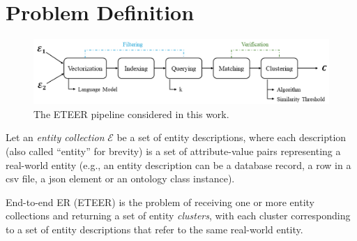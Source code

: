 \section{Problem Definition}\label{sec:problem}

\begin{figure}[t]
    \centering
\includegraphics[width=0.97\linewidth]{figures/pyjedai/pipeline-AutoER.png}
    \caption{The ETEER pipeline considered in this work.}
    \label{fig:eeter_pipeline}
\end{figure}


Let an \emph{entity collection} $\mathcal{E}$ be a set of entity descriptions, where each description (also called ``entity'' for brevity)
is a set of attribute-value pairs representing a real-world entity (e.g., an entity description can be a database record, a row in a csv file, a json element or an ontology class instance). 

End-to-end ER (ETEER) is the problem of receiving one or more entity collections and returning a set of entity \emph{clusters}, with each cluster corresponding to a set of entity descriptions that refer to the same real-world entity. 

